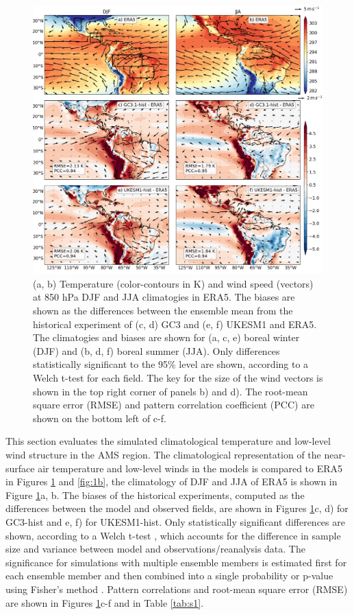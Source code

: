 \begin{figure}[t!]
\centering
 \includegraphics[width=\linewidth]{figures/fig1p2_f1a.png}
\caption{ (a, b) Temperature (color-contours in K) and wind speed (vectors) at 850 hPa DJF and JJA climatogies in ERA5. The biases are shown as the differences between the ensemble mean from the historical experiment of (c, d) GC3 and  (e, f) UKESM1 and ERA5.
The climatogies and biases are shown for (a, c, e) boreal winter (DJF) and (b, d, f) boreal summer (JJA). Only differences statistically significant to the 95\% level are shown, according to a Welch t-test for each field. The key for the size of the wind vectors is shown in the top right corner of panels b) and d). The root-mean square error (RMSE) and pattern correlation coefficient (PCC) are shown on the bottom left of c-f.}
\label{fig:1}
\end{figure}

This section evaluates the simulated climatological temperature and low-level wind structure in the AMS region.
The climatological representation of the near-surface air temperature and low-level winds in the models is compared to ERA5 in Figures \ref{fig:1} and \ref{fig:1b}, the climatology of DJF and JJA of ERA5 is shown in Figure \ref{fig:1}a, b.
The biases of the historical experiments, computed as the differences between the model and observed fields, are shown in Figures \ref{fig:1}c, d) for GC3-hist and e, f) for UKESM1-hist.
 Only statistically significant differences are shown, according to a Welch t-test \citep{wilks2011}, which accounts for the difference in sample size and variance between model and observations/reanalysis data. The significance for simulations with multiple ensemble members is estimated first for each ensemble member and then combined into a single probability or p-value using Fisher's method \citep{fisher1992statistical}. Pattern correlations and root-mean square error (RMSE) are shown in Figures \ref{fig:1}c-f and in Table \ref{tab:s1}.
 

